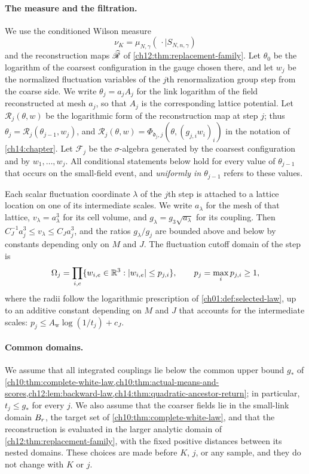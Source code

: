 \paragraph{The measure and the filtration.}
We use the conditioned Wilson measure
\[
 \nu_K=\mu_{N,\gamma}(\,\cdot\mid S_{N,n,\gamma})
\]
and the reconstruction maps $\widehat{\mathscr R}$ of \cref{ch12:thm:replacement-family}. Let $\theta_0$ be the logarithm of the coarsest configuration in the gauge chosen there, and let $w_j$ be the normalized fluctuation variables of the $j$th renormalization group step from the coarse side. We write $\theta_j=a_jA_j$ for the link logarithm of the field reconstructed at mesh $a_j$, so that $A_j$ is the corresponding lattice potential. Let $\mathscr R_j(\theta,w)$ be the logarithmic form of the reconstruction map at step $j$; thus $\theta_j=\mathscr R_j(\theta_{j-1},w_j)$, and $\mathscr R_j(\theta,w)=\widehat\Phi_{\mathfrak d_j,j}(\theta,(g_{j,i}w_i)_i)$ in the notation of \cref{ch14:chapter}. Let $\mathcal F_j$ be the $\sigma$-algebra generated by the coarsest configuration and by $w_1,\dots,w_j$. All conditional statements below hold for every value of $\theta_{j-1}$ that occurs on the small-field event, and \emph{uniformly in $\theta_{j-1}$} refers to these values.

Each scalar fluctuation coordinate $\lambda$ of the $j$th step is attached to a lattice location on one of its intermediate scales. We write $a_\lambda$ for the mesh of that lattice, $v_\lambda=a_\lambda^3$ for its cell volume, and $g_\lambda=g_3\sqrt{a_\lambda}$ for its coupling. Then $C_J^{-1}a_j^3\le v_\lambda\le C_Ja_j^3$, and the ratios $g_\lambda/g_j$ are bounded above and below by constants depending only on $M$ and $J$. The fluctuation cutoff domain of the step is
\[
 \Omega_j=\prod_{i,e}\{w_{i,e}\in\mathbb R^3:\lvert w_{i,e}\rvert\le p_{j,i}\},\qquad p_j=\max_ip_{j,i}\ge1,
\]
where the radii follow the logarithmic prescription of \cref{ch01:def:selected-law}, up to an additive constant depending on $M$ and $J$ that accounts for the intermediate scales: $p_j\le A_{\mathrm w}\log(1/t_j)+c_J$.

\paragraph{Common domains.}
We assume that all integrated couplings lie below the common upper bound $g_*$ of \cref{ch10:thm:complete-white-law,ch10:thm:actual-means-and-scores,ch12:lem:backward-law,ch14:thm:quadratic-ancestor-return}; in particular, $t_j\le g_*$ for every $j$. We also assume that the coarser fields lie in the small-link domain $B_{r}$, the target set of \cref{ch10:thm:complete-white-law}, and that the reconstruction is evaluated in the larger analytic domain of \cref{ch12:thm:replacement-family}, with the fixed positive distances between its nested domains. These choices are made before $K$, $j$, or any sample, and they do not change with $K$ or $j$.

